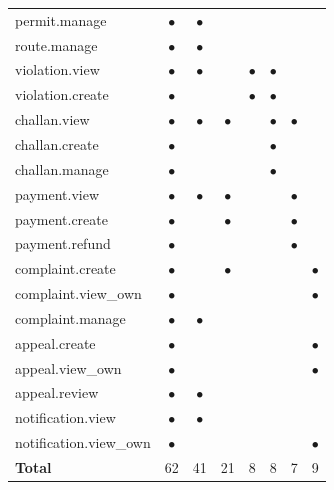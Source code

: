 \begin{longtable}{@{}p{4.6cm}ccccccc@{}}
permit.manage & $\bullet$ & $\bullet$ &  &  &  &  &  \\
route.manage & $\bullet$ & $\bullet$ &  &  &  &  &  \\
violation.view & $\bullet$ & $\bullet$ &  & $\bullet$ & $\bullet$ &  &  \\
violation.create & $\bullet$ &  &  & $\bullet$ & $\bullet$ &  &  \\
challan.view & $\bullet$ & $\bullet$ & $\bullet$ &  & $\bullet$ & $\bullet$ &  \\
challan.create & $\bullet$ &  &  &  & $\bullet$ &  &  \\
challan.manage & $\bullet$ &  &  &  & $\bullet$ &  &  \\
payment.view & $\bullet$ & $\bullet$ & $\bullet$ &  &  & $\bullet$ &  \\
payment.create & $\bullet$ &  & $\bullet$ &  &  & $\bullet$ &  \\
payment.refund & $\bullet$ &  &  &  &  & $\bullet$ &  \\
complaint.create & $\bullet$ &  & $\bullet$ &  &  &  & $\bullet$ \\
complaint.view\_\allowbreak{}own & $\bullet$ &  &  &  &  &  & $\bullet$ \\
complaint.manage & $\bullet$ & $\bullet$ &  &  &  &  &  \\
appeal.create & $\bullet$ &  &  &  &  &  & $\bullet$ \\
appeal.view\_\allowbreak{}own & $\bullet$ &  &  &  &  &  & $\bullet$ \\
appeal.review & $\bullet$ & $\bullet$ &  &  &  &  &  \\
notification.view & $\bullet$ & $\bullet$ &  &  &  &  &  \\
notification.view\_\allowbreak{}own & $\bullet$ &  &  &  &  &  & $\bullet$ \\
\midrule \textbf{Total} & 62 & 41 & 21 & 8 & 8 & 7 & 9 \\
\end{longtable}